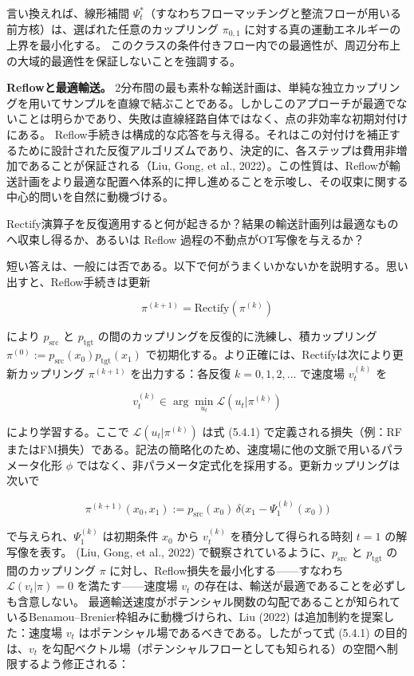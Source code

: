 言い換えれば、線形補間 $\Psi_t^*$（すなわちフローマッチングと整流フローが用いる前方核）は、選ばれた任意のカップリング $\pi_{0,1}$ に対する真の運動エネルギーの上界を最小化する。
このクラスの条件付きフロー内での最適性が、周辺分布上の大域的最適性を保証しないことを強調する。

\textbf{Reflowと最適輸送。} 2分布間の最も素朴な輸送計画は、単純な独立カップリングを用いてサンプルを直線で結ぶことである。しかしこのアプローチが最適でないことは明らかであり、失敗は直線経路自体ではなく、点の非効率な初期対付けにある。
Reflow手続きは構成的な応答を与え得る。それはこの対付けを補正するために設計された反復アルゴリズムであり、決定的に、各ステップは費用非増加であることが保証される（Liu, Gong, et al., 2022）。この性質は、Reflowが輸送計画をより最適な配置へ体系的に押し進めることを示唆し、その収束に関する中心的問いを自然に動機づける。

\begin{propositionbox}[問い 7.5.2]
Rectify演算子を反復適用すると何が起きるか？結果の輸送計画列は最適なものへ収束し得るか、あるいは Reflow 過程の不動点がOT写像を与えるか？
\end{propositionbox}


短い答えは、一般には否である。以下で何がうまくいかないかを説明する。思い出すと、Reflow手続きは更新

\[
\pi^{(k+1)}=\mathrm{Rectify}(\pi^{(k)})
\]


により $p_{\mathrm{src}}$ と $p_{\mathrm{tgt}}$ の間のカップリングを反復的に洗練し、積カップリング $\pi^{(0)}:=p_{\mathrm{src}}(x_0)p_{\mathrm{tgt}}(x_1)$ で初期化する。より正確には、Rectifyは次により更新カップリング $\pi^{(k+1)}$ を出力する：各反復 $k=0,1,2,\ldots$ で速度場 $v_t^{(k)}$ を

\[
v_t^{(k)}\in\arg\min_{u_t}\mathcal{L}(u_t|\pi^{(k)})
\]


により学習する。ここで $\mathcal{L}(u_t|\pi^{(k)})$ は式 (5.4.1) で定義される損失（例：RFまたはFM損失）である。記法の簡略化のため、速度場に他の文脈で用いるパラメータ化形 $\phi$ ではなく、非パラメータ定式化を採用する。更新カップリングは次いで

\[
\pi^{(k+1)}(x_0,x_1):=p_{\mathrm{src}}(x_0)\,\delta\bigl(x_1-\Psi_1^{(k)}(x_0)\bigr)
\]


で与えられ、$\Psi_1^{(k)}$ は初期条件 $x_0$ から $v_t^{(k)}$ を積分して得られる時刻 $t=1$ の解写像を表す。
(Liu, Gong, et al., 2022) で観察されているように、$p_{\mathrm{src}}$ と $p_{\mathrm{tgt}}$ の間のカップリング $\pi$ に対し、Reflow損失を最小化する——すなわち $\mathcal{L}(v_t|\pi)=0$ を満たす——速度場 $v_t$ の存在は、輸送が最適であることを必ずしも含意しない。
最適輸送速度がポテンシャル関数の勾配であることが知られているBenamou–Brenier枠組みに動機づけられ、Liu (2022) は追加制約を提案した：速度場 $v_t$ はポテンシャル場であるべきである。したがって式 (5.4.1) の目的は、$v_t$ を勾配ベクトル場（ポテンシャルフローとしても知られる）の空間へ制限するよう修正される：

